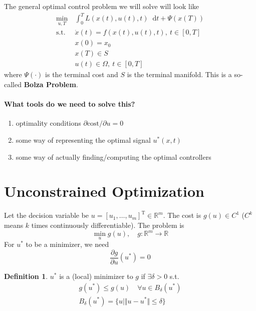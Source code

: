 \documentclass[letterpaper,12pt,titlepage]{report}
\newcommand*\dif{\mathop{}\!\mathrm{d}}
\newcommand{\trans}{^\text{T}}
\newcommand*\pder[2]{\frac{\partial #1}{\partial #2}}
\theoremstyle{plain}
\theoremstyle{definition}
\newtheorem*{defi}{Definition}
\begin{document}
The general optimal control problem we will solve will look like
\begin{align}
  \min_{u,T} {}\ & \int_0^T\! L(x(t),u(t),t) \dif t + \Psi(x(T)) \\
  \text{s.t. } & \dot{x}(t) = f(x(t),u(t),t),\ t\in[0,T] \\
                 & x(0) = x_0 \\
                 & x(T) \in S \\
                 & u(t) \in \Omega,\ t\in[0,T]
\end{align}
where $\Psi(\cdot)$ is the terminal cost and $S$ is the terminal manifold. This is a so-called \textbf{Bolza Problem}.

\paragraph{What tools do we need to solve this?}
\begin{enumerate}
\item optimality conditions $\partial\text{cost}/\partial u=0$
\item some way of representing the optimal signal $u^*(x,t)$
\item some way of actually finding/computing the optimal controllers
\end{enumerate}

\section{Unconstrained Optimization}

Let the decision variable be $u=[u_1, \dots, u_m]\trans\in\mathbb R^m$. The cost is $g(u)\in C^1$ ($C^k$ means $k$ times continuously differentiable). The problem is
\[ \min_u g(u), \quad g:\mathbb R^m \to \mathbb R \]
For $u^*$ to be a minimizer, we need
\[ \pder{g}{u} (u^*) = 0 \]
\begin{defi}
$u^*$ is a (local) minimizer to $g$ if $\exists\delta>0$ s.t.
\begin{gather}
g(u^*) \le g(u) \quad \forall u\in B_\delta(u^*) \\
B_\delta(u^*) = \{ u \mid \Vert u-u^* \Vert \le \delta \}
\end{gather}
\end{defi}
\end{document}
